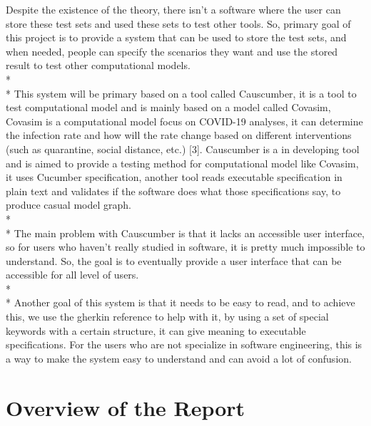Despite the existence of the theory, there isn’t a software where the user can store these test sets and used these sets to test other tools. So, primary goal of this project is to provide a system that can be used to store the test sets, and when needed, people can specify the scenarios they want and use the stored result to test other computational models. \\*\\*
This system will be primary based on a tool called Causcumber, it is a tool to test computational model and is mainly based on a model called Covasim, Covasim is a computational model focus on COVID-19 analyses, it can determine the infection rate and how will the rate change based on different interventions (such as quarantine, social distance, etc.) [3]. Causcumber is a in developing tool and is aimed to provide a testing method for computational model like Covasim, it uses Cucumber specification, another tool reads executable specification in plain text and validates if the software does what those specifications say, to produce casual model graph. \\*\\*
The main problem with Causcumber is that it lacks an accessible user interface, so for users who haven’t really studied in software, it is pretty much impossible to understand. So, the goal is to eventually provide a user interface that can be accessible for all level of users. \\*\\*
Another goal of this system is that it needs to be easy to read, and to achieve this, we use the gherkin reference to help with it, by using a set of special keywords with a certain structure, it can give meaning to executable specifications. For the users who are not specialize in software engineering, this is a way to make the system easy to understand and can avoid a lot of confusion.


\section{Overview of the Report}

